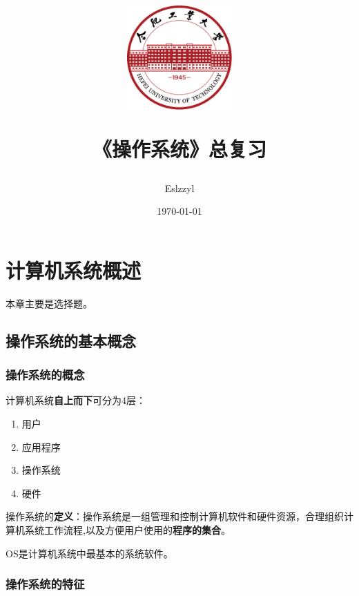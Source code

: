 \documentclass[12pt, a4paper, oneside]{ctexart}
\title{
    \includegraphics[width=0.3\textwidth]{../../share/images/hfut-badge.pdf}
    
    \vspace{20pt}
    《操作系统》总复习
}
\author{Eslzzyl}
\date{\today}
\begin{document}
\maketitle
\newpage
\tableofcontents
\vspace{20pt}

\newpage

\section{计算机系统概述}

本章主要是选择题。

\subsection{操作系统的基本概念}

\subsubsection{操作系统的概念}

计算机系统\textbf{自上而下}可分为4层：
\begin{enumerate}
  \item 用户
  \item 应用程序
  \item 操作系统
  \item 硬件
\end{enumerate}

操作系统的\textbf{定义}：操作系统是一组管理和控制计算机软件和硬件资源，合理组织计算机系统工作流程,以及方便用户使用的\textbf{程序的集合}。

OS是计算机系统中最基本的系统软件。

\subsubsection{操作系统的特征}
\end{document}
